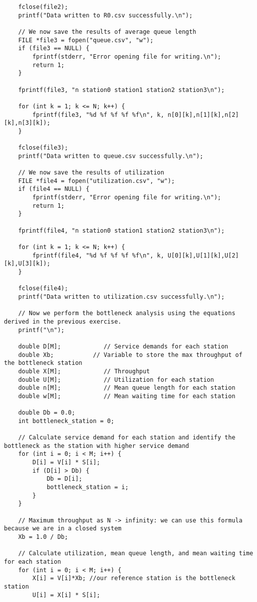 \documentclass[12pt]{article}
\begin{document}
\begin{verbatim}
	fclose(file2);
	printf("Data written to R0.csv successfully.\n");
	
	// We now save the results of average queue length
	FILE *file3 = fopen("queue.csv", "w");
	if (file3 == NULL) {
		fprintf(stderr, "Error opening file for writing.\n");
		return 1;
	}
	
	fprintf(file3, "n station0 station1 station2 station3\n");
	
	for (int k = 1; k <= N; k++) {
		fprintf(file3, "%d %f %f %f %f\n", k, n[0][k],n[1][k],n[2][k],n[3][k]);
	}
	
	fclose(file3);
	printf("Data written to queue.csv successfully.\n");
	
	// We now save the results of utilization
	FILE *file4 = fopen("utilization.csv", "w");
	if (file4 == NULL) {
		fprintf(stderr, "Error opening file for writing.\n");
		return 1;
	}
	
	fprintf(file4, "n station0 station1 station2 station3\n");
	
	for (int k = 1; k <= N; k++) {
		fprintf(file4, "%d %f %f %f %f\n", k, U[0][k],U[1][k],U[2][k],U[3][k]);
	}
	
	fclose(file4);
	printf("Data written to utilization.csv successfully.\n");
	
	// Now we perform the bottleneck analysis using the equations derived in the previous exercise.
	printf("\n");
	
	double D[M];            // Service demands for each station
	double Xb;           // Variable to store the max throughput of the bottleneck station
	double X[M];            // Throughput
	double U[M];            // Utilization for each station
	double n[M];            // Mean queue length for each station
	double w[M];            // Mean waiting time for each station
	
	double Db = 0.0;
	int bottleneck_station = 0;
	
	// Calculate service demand for each station and identify the bottleneck as the station with higher service demand
	for (int i = 0; i < M; i++) {
		D[i] = V[i] * S[i];
		if (D[i] > Db) {
			Db = D[i];
			bottleneck_station = i;
		}
	}
	
	// Maximum throughput as N -> infinity: we can use this formula because we are in a closed system
	Xb = 1.0 / Db;
	
	// Calculate utilization, mean queue length, and mean waiting time for each station
	for (int i = 0; i < M; i++) {
		X[i] = V[i]*Xb; //our reference station is the bottleneck station
		U[i] = X[i] * S[i];
		

\end{verbatim}
\end{document}
